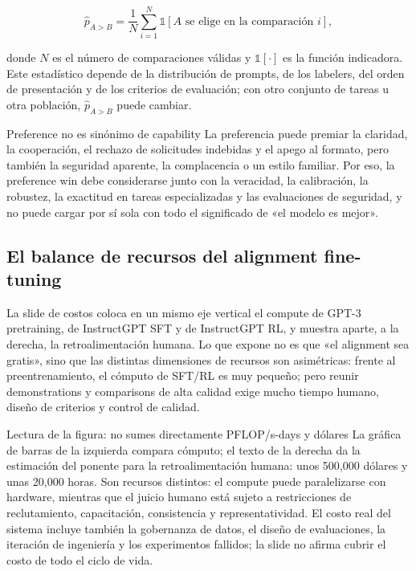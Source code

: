 \[
\widehat{p}_{A>B}=\frac{1}{N}\sum_{i=1}^{N}\mathbb{1}[A\text{ se elige en la comparación }i],
\]

donde $N$ es el número de comparaciones válidas y $\mathbb{1}[\cdot]$ es la función indicadora. Este estadístico depende de la distribución de prompts, de los labelers, del orden de presentación y de los criterios de evaluación; con otro conjunto de tareas u otra población, $\widehat{p}_{A>B}$ puede cambiar.

\begin{warningbox}{Preference no es sinónimo de capability}
La preferencia puede premiar la claridad, la cooperación, el rechazo de solicitudes indebidas y el apego al formato, pero también la seguridad aparente, la complacencia o un estilo familiar. Por eso, la preference win debe considerarse junto con la veracidad, la calibración, la robustez, la exactitud en tareas especializadas y las evaluaciones de seguridad, y no puede cargar por sí sola con todo el significado de «el modelo es mejor».
\end{warningbox}

\subsection{El balance de recursos del alignment fine-tuning}

La slide de costos coloca en un mismo eje vertical el compute de GPT-3 pretraining, de InstructGPT SFT y de InstructGPT RL, y muestra aparte, a la derecha, la retroalimentación humana. Lo que expone no es que «el alignment sea gratis», sino que las distintas dimensiones de recursos son asimétricas: frente al preentrenamiento, el cómputo de SFT/RL es muy pequeño; pero reunir demonstrations y comparisons de alta calidad exige mucho tiempo humano, diseño de criterios y control de calidad.


\begin{knowledgebox}{Lectura de la figura: no sumes directamente PFLOP/s-days y dólares}
La gráfica de barras de la izquierda compara cómputo; el texto de la derecha da la estimación del ponente para la retroalimentación humana: unos 500,000 dólares y unas 20,000 horas. Son recursos distintos: el compute puede paralelizarse con hardware, mientras que el juicio humano está sujeto a restricciones de reclutamiento, capacitación, consistencia y representatividad. El costo real del sistema incluye también la gobernanza de datos, el diseño de evaluaciones, la iteración de ingeniería y los experimentos fallidos; la slide no afirma cubrir el costo de todo el ciclo de vida.
\end{knowledgebox}

